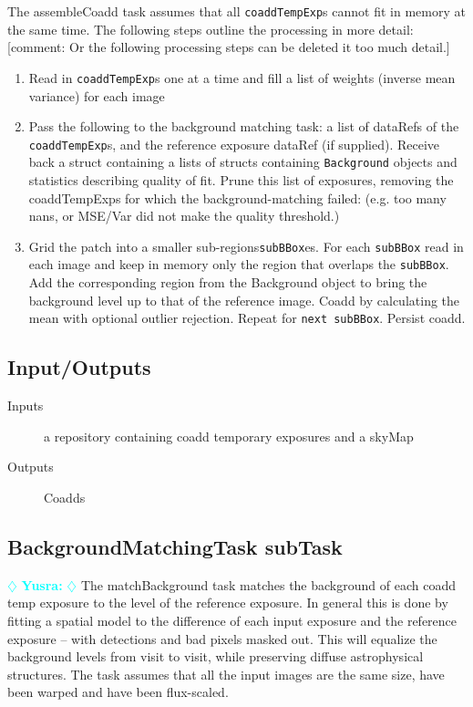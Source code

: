 \documentclass[12pt]{article}
\newcommand{\yusra} { \textcolor{cyan} {
\ensuremath{\diamondsuit} {\bf Yusra:}  
\ensuremath{\diamondsuit} } }
\newcommand{\comment}[1]{{\color{cyan} [{comment: #1}]}}
\begin{document}
The assembleCoadd task assumes that all {\tt coaddTempExp}s cannot fit in memory at the same time. The following steps outline the processing in more detail: \comment{Or the following processing steps can be deleted it too much detail.}
\begin{enumerate}
\item  Read in {\tt coaddTempExp}s one at a time and fill a list of weights (inverse mean variance) for each image 
\item Pass the following to the background matching task: a list of dataRefs of the {\tt coaddTempExp}s, and the reference exposure dataRef (if supplied).  Receive back a struct containing a lists of structs containing  {\tt Background} objects and statistics describing quality of fit.  Prune this list of exposures, removing the coaddTempExps for which the background-matching failed: (e.g. too many nans, or MSE/Var did not make the quality threshold.)
\item Grid the patch into a smaller sub-regions{\tt subBBox}es. For each  {\tt subBBox} read in each image and keep in memory only the region that overlaps the {\tt subBBox}. Add the corresponding region from the Background object to bring the background level up to that of the reference image.  Coadd by calculating the mean with optional outlier rejection.  Repeat for {\tt next subBBox}.  Persist coadd. 
\end{enumerate}



\subsection{Input/Outputs}
\begin{description}
\item[Inputs]  a repository containing coadd temporary exposures and a skyMap
\item[Outputs]  Coadds
\end{description}

\subsection{BackgroundMatchingTask subTask} \yusra
The matchBackground task matches the background of each coadd temp exposure to the level of the reference exposure.   In general this is done by fitting a spatial model to the difference of each input exposure and the reference exposure -- with detections and bad pixels masked out.  This will equalize the background levels from visit to visit, while preserving diffuse astrophysical structures.  The task assumes that all the input images are the same size, have been warped  and have been flux-scaled. 
\end{document}
